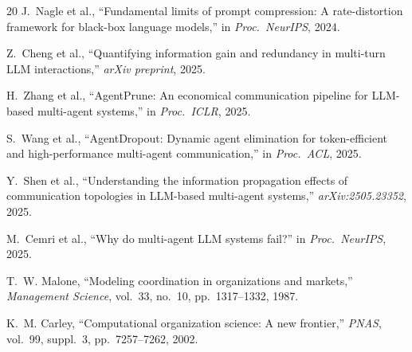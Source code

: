 \documentclass[conference]{IEEEtran}
\begin{document}
\begin{thebibliography}{20}
J.~Nagle et al.,
``Fundamental limits of prompt compression: A rate-distortion framework for black-box language models,''
in \emph{Proc.\ NeurIPS}, 2024.

Z.~Cheng et al.,
``Quantifying information gain and redundancy in multi-turn LLM interactions,''
\emph{arXiv preprint}, 2025.

H.~Zhang et al.,
``AgentPrune: An economical communication pipeline for LLM-based multi-agent systems,''
in \emph{Proc.\ ICLR}, 2025.

S.~Wang et al.,
``AgentDropout: Dynamic agent elimination for token-efficient and high-performance multi-agent communication,''
in \emph{Proc.\ ACL}, 2025.

Y.~Shen et al.,
``Understanding the information propagation effects of communication topologies in LLM-based multi-agent systems,''
\emph{arXiv:2505.23352}, 2025.

M.~Cemri et al.,
``Why do multi-agent LLM systems fail?''
in \emph{Proc.\ NeurIPS}, 2025.

T.~W. Malone,
``Modeling coordination in organizations and markets,''
\emph{Management Science}, vol.~33, no.~10, pp.~1317--1332, 1987.

K.~M. Carley,
``Computational organization science: A new frontier,''
\emph{PNAS}, vol.~99, suppl.~3, pp.~7257--7262, 2002.

\end{thebibliography}
\end{document}
